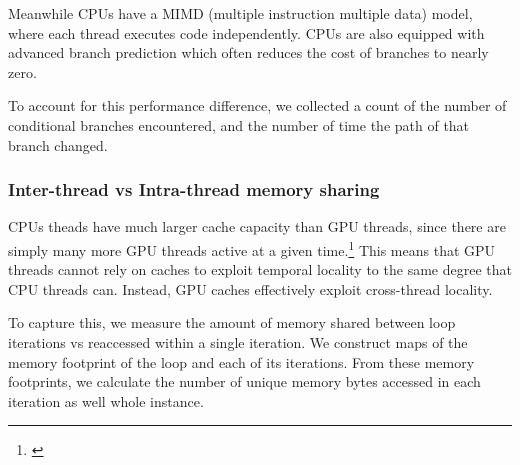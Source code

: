 \documentclass[12pt,twoside]{reedthesis}
\begin{document}
		Meanwhile CPUs have a MIMD (multiple instruction multiple data) model, where each thread executes code independently. CPUs are also equipped with advanced branch prediction which often reduces the cost of branches to nearly zero. 
		
		To account for this performance difference, we collected a count of the number of conditional branches encountered, and the number of time the path of that branch changed. 
		
		\subsubsection{Inter-thread vs Intra-thread memory sharing}
		
		CPUs theads have much larger cache capacity than GPU threads, since there are simply many more GPU threads active at a given time.\footnote{\cite{Jia:6835938}} This means that GPU threads cannot rely on caches to exploit temporal locality to the same degree that CPU threads can. Instead, GPU caches effectively exploit cross-thread locality. 
		
		To capture this, we measure the amount of memory shared between loop iterations vs reaccessed within a single iteration.
		We construct maps of the memory footprint of the loop and each of its iterations. From these memory footprints, we calculate the number of unique memory bytes accessed in each iteration as well whole instance. %
		
%		
%		
%		
%		
%		
%		
%		
%		
%		
%		
%		
%		
%
\end{document}
